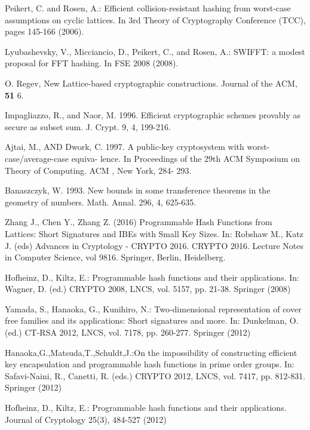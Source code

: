 \documentclass[10pt]{elsarticle}
\begin{document}
\begin{thebibliography}{9}
Peikert, C. and Rosen, A.: Efficient collision-resistant hashing from worst-case assumptions on cyclic lattices. In 3rd Theory of Cryptography Conference (TCC), pages 145-166 (2006).

Lyubashevsky, V., Micciancio, D., Peikert, C., and Rosen, A.: SWIFFT: a modest proposal for FFT hashing. In FSE 2008 (2008).

 O. Regev, New Lattice-based cryptographic constructions. Journal of the ACM, \textbf{51} 6.



 Impagliazzo, R., and Naor, M. 1996. Efficient cryptographic schemes provably as secure as subset sum. J. Crypt. 9, 4, 199-216.

 Ajtai, M., AND Dwork, C. 1997. A public-key cryptosystem with worst-case/average-case equiva- lence. In Proceedings of the 29th ACM Symposium on Theory of Computing. ACM , New York, 284- 293.

Banaszczyk, W. 1993. New bounds in some transference theorems in the geometry of numbers. Math. Annal. 296, 4, 625-635.

 Zhang J., Chen Y., Zhang Z. (2016) Programmable Hash Functions from Lattices: Short Signatures and IBEs with Small Key Sizes. In: Robshaw M., Katz J. (eds) Advances in Cryptology - CRYPTO 2016. CRYPTO 2016. Lecture Notes in Computer Science, vol 9816. Springer, Berlin, Heidelberg.



Hofheinz, D., Kiltz, E.: Programmable hash functions and their applications. In: Wagner, D. (ed.) CRYPTO 2008, LNCS, vol. 5157, pp. 21-38. Springer (2008)

Yamada, S., Hanaoka, G., Kunihiro, N.: Two-dimensional representation of cover free families and its applications: Short signatures and more. In: Dunkelman, O. (ed.) CT-RSA 2012, LNCS, vol. 7178, pp. 260-277. Springer (2012)

 Hanaoka,G.,Matsuda,T.,Schuldt,J.:On the impossibility of constructing efficient key encapsulation and programmable hash functions in prime order groups. In: Safavi-Naini, R., Canetti, R. (eds.) CRYPTO 2012, LNCS, vol. 7417, pp. 812-831.
Springer (2012)

 Hofheinz, D., Kiltz, E.: Programmable hash functions and their applications. Journal of Cryptology 25(3), 484-527 (2012)


\end{thebibliography}
\end{document}
